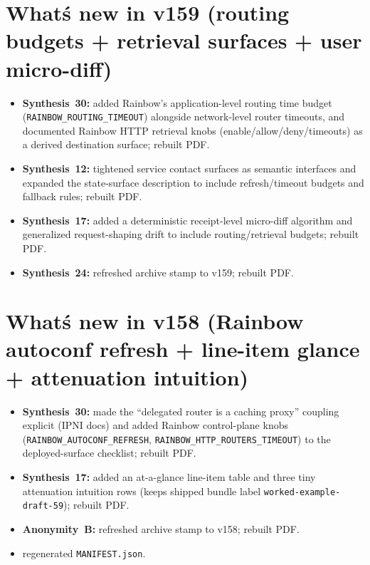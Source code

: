 \documentclass[11pt]{article}
\begin{document}
\section{What\'s new in v159 (routing budgets + retrieval surfaces + user micro-diff)}
\begin{itemize}[leftmargin=*]
\item \textbf{Synthesis~30:} added Rainbow's application-level routing time budget (\texttt{RAINBOW\_ROUTING\_TIMEOUT}) alongside network-level router timeouts, and documented Rainbow HTTP retrieval knobs (enable/allow/deny/timeouts) as a derived destination surface; rebuilt PDF.
\item \textbf{Synthesis~12:} tightened service contact surfaces as semantic interfaces and expanded the state-surface description to include refresh/timeout budgets and fallback rules; rebuilt PDF.
\item \textbf{Synthesis~17:} added a deterministic receipt-level micro-diff algorithm and generalized request-shaping drift to include routing/retrieval budgets; rebuilt PDF.
\item \textbf{Synthesis~24:} refreshed archive stamp to v159; rebuilt PDF.
\end{itemize}

\section{What\'s new in v158 (Rainbow autoconf refresh + line-item glance + attenuation intuition)}
\begin{itemize}[leftmargin=*]
\item \textbf{Synthesis~30:} made the ``delegated router is a caching proxy'' coupling explicit (IPNI docs) and added Rainbow control-plane knobs (\texttt{RAINBOW\_AUTOCONF\_REFRESH}, \texttt{RAINBOW\_HTTP\_ROUTERS\_TIMEOUT}) to the deployed-surface checklist; rebuilt PDF.
\item \textbf{Synthesis~17:} added an at-a-glance line-item table and three tiny attenuation intuition rows (keeps shipped bundle label \texttt{worked-example-draft-59}); rebuilt PDF.
\item \textbf{Anonymity~B:} refreshed archive stamp to v158; rebuilt PDF.
\item regenerated \texttt{MANIFEST.json}.
\end{itemize}
\end{document}
